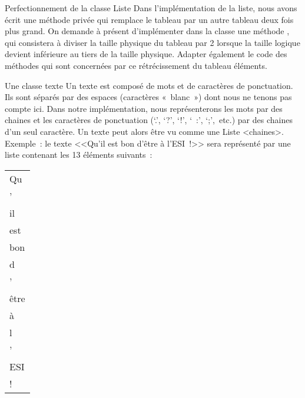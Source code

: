 \begin{Exercice}{Perfectionnement de la classe Liste}
	Dans l’implémentation de la liste, nous avons écrit 
	une méthode privée  qui remplace le tableau 
	 par un autre tableau deux fois plus grand. 
	On demande à présent d’implémenter dans la classe 
	une méthode , qui consistera à diviser la 
	taille physique du tableau par 2 lorsque la taille 
	logique devient inférieure au tiers de la taille physique.
	Adapter également le code des méthodes qui sont concernées 
	par ce rétrécissement du tableau éléments.

\end{Exercice}

\begin{Exercice}{Une classe texte}
	Un texte est composé de mots et de caractères de ponctuation. 
	Ils sont séparés par des espaces (caractères «~blanc~») dont 
	nous ne tenons pas compte ici. Dans notre implémentation, nous 
	représenterons les mots par des chaines et les caractères de ponctuation 
	(‘.’, ‘?’, ‘!’, ‘~:’, ‘;’,~etc.) par des chaines d’un seul caractère. 
	Un texte peut alors être vu comme une Liste <chaines>. 
	Exemple~: le texte <<Qu’il est bon d’être à l’ESI~!>>
	sera représenté par une liste contenant les 13 éléments suivants~:
	\begin{center}
	\begin{tabular}{|m{8cm}|}
		\hline
		Qu \\
		’	\\
		il \\
		est \\
		bon \\
		d \\
		’ \\
		être \\
		à \\
		l \\
		’ \\
		ESI \\
		! \\\hline
	\end{tabular}
	\end{center}
	

\end{Exercice}
